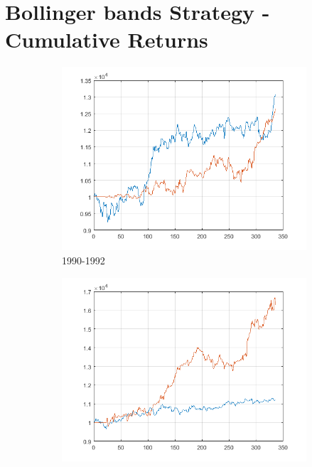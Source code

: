 \documentclass[11pt,a4,twosided,singlespacing,titlepagenumber=on]{scrreprt}
\numberwithin{equation}{chapter} %
\theoremstyle{remark}
\begin{document}
\section{Bollinger bands Strategy - Cumulative Returns}
\label{app:portfolio_valuation_simple}

\begin{figure}[H]
    \centering
    \begin{subfigure}[t]{0.32\textwidth}
        \centering
        \includegraphics[width=1\textwidth]{res/backtest/1}
        \caption{1990-1992}
    \end{subfigure}
    \begin{subfigure}[t]{0.32\textwidth}
        \centering
        \includegraphics[width=1\textwidth]{res/backtest/2}

\end{subfigure}
\end{figure}
\end{document}
